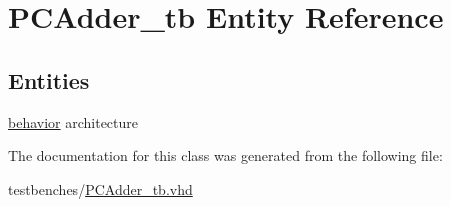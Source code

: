 \hypertarget{class_p_c_adder__tb}{\section{\-P\-C\-Adder\-\_\-tb \-Entity \-Reference}
\label{class_p_c_adder__tb}
}
\subsection*{\-Entities}
\begin{DoxyCompactItemize}
\item 
\hyperlink{class_p_c_adder__tb_1_1behavior}{behavior} architecture
\end{DoxyCompactItemize}


\-The documentation for this class was generated from the following file\-:\begin{DoxyCompactItemize}
\item 
testbenches/\hyperlink{_p_c_adder__tb_8vhd}{\-P\-C\-Adder\-\_\-tb.\-vhd}\end{DoxyCompactItemize}
